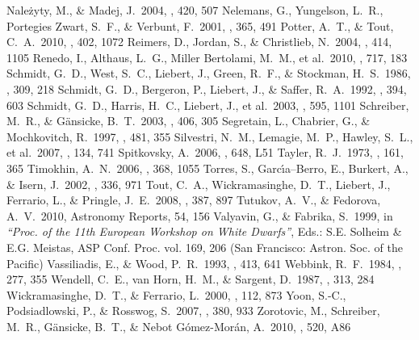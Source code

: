 \documentclass[]{emulateapj}
\begin{document}
\begin{thebibliography}{}
 Nale{\.z}yty, M., \& Madej, J.\ 2004, \aap, 420, 507
 Nelemans, G., Yungelson, L.~R., Portegies Zwart, S.~F., \& Verbunt, F.\ 2001, \aap, 365, 491 
 Potter, A.~T., \& Tout, C.~A.\ 2010, \mnras, 402, 1072
 Reimers, D., Jordan, S., \& Christlieb, N.\ 2004, \aap, 414, 1105
 Renedo, I., Althaus, L.~G., Miller Bertolami, M.~M., et al.\ 2010, \apj, 717, 183 
 Schmidt, G.~D., West, S.~C., Liebert, J., Green, R.~F., \& Stockman, H.~S.\ 1986, \apj, 309, 218
 Schmidt, G.~D., Bergeron, P., Liebert, J., \& Saffer, R.~A.\ 1992, \apj, 394, 603
 Schmidt, G.~D., Harris, H.~C., Liebert, J., et al.\ 2003, \apj, 595, 1101
 Schreiber, M.~R., \& G\"ansicke, B.~T.\ 2003, \aap, 406, 305 
 Segretain, L., Chabrier, G., \& Mochkovitch, R.\ 1997, \apj, 481, 355
 Silvestri, N.~M., Lemagie, M.~P., Hawley, S.~L., et al.\ 2007, \aj, 134, 741
 Spitkovsky, A.\ 2006, \apjl, 648, L51
 Tayler, R.~J.\ 1973, \mnras, 161, 365 
 Timokhin, A.~N.\ 2006, \mnras, 368, 1055
 Torres, S., Garc{\'{\i}}a--Berro, E., Burkert, A., \& Isern, J.\ 2002, \mnras, 336, 971
 Tout, C.~A., Wickramasinghe, D.~T., Liebert, J., Ferrario, L., \& Pringle, J.~E.\ 2008, \mnras, 387, 897
 Tutukov, A.~V., \& Fedorova, A.~V.\ 2010, Astronomy Reports, 54, 156 
 Valyavin, G., \& Fabrika, S.\ 1999, in {\sl ``Proc. of the 11th European Workshop on White Dwarfs''}, Eds.: S.E. Solheim \& E.G. Meistas, ASP Conf. Proc. vol. 169, 206 (San Francisco: Astron. Soc. of the Pacific)
 Vassiliadis, E., \& Wood, P.~R.\ 1993, \apj, 413, 641 
 Webbink, R.~F.\ 1984, \apj, 277, 355
 Wendell, C.~E., van Horn, H.~M., \& Sargent, D.\ 1987, \apj, 313, 284 
 Wickramasinghe, D.~T., \& Ferrario, L.\ 2000, \pasp, 112, 873
 Yoon, S.-C., Podsiadlowski, P., \& Rosswog, S.\ 2007, \mnras, 380, 933
 Zorotovic, M., Schreiber, M.~R., G{\"a}nsicke, B.~T., \& Nebot G{\'o}mez-Mor{\'a}n, A.\ 2010, \aap, 520, A86 
\end{thebibliography} 
\end{document}
